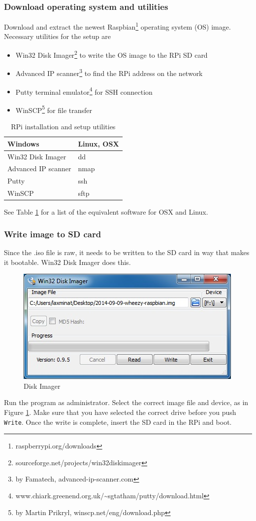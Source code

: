 \subsubsection{Download operating system and utilities}
Download and extract the newest Raspbian\footnote{raspberrypi.org/downloads} operating system (OS) image. Necessary utilities for the setup are
\begin{itemize}
	\item Win32 Disk Imager\footnote{sourceforge.net/projects/win32diskimager} to write the OS image to the RPi SD card
	\item Advanced IP scanner\footnote{by Famatech, advanced-ip-scanner.com} to find the RPi address on the network 
	\item Putty terminal emulator\footnote{www.chiark.greenend.org.uk/\textasciitilde{}sgtatham/putty/download.html} for SSH connection
	\item WinSCP\footnote{by Martin Prikryl, winscp.net/eng/download.php} for file transfer
\end{itemize}
\begin{table}[h!]
	\centering
	\begin{tabular}{ll}
		\hline
		Windows & Linux, OSX\\
		\hline 
		Win32 Disk Imager & dd\\
		Advanced IP scanner & nmap\\
		Putty & ssh\\
		WinSCP & sftp\\
		\hline
	\end{tabular}
	\caption{RPi installation and setup utilities}
	\label{tab:RPi_utilities} 
\end{table}
See Table \ref{tab:RPi_utilities} for a list of the equivalent software for OSX and Linux.
\subsubsection{Write image to SD card}
Since the .iso file is raw, it needs to be written to the SD card in way that makes it bootable. Win32 Disk Imager does this.
\begin{figure}[htb!]
	\centering \includegraphics[scale=0.45]{fig/Rpi_DiskImager} \caption{Disk Imager}
	\label{fig: Disk Imager} 
\end{figure}
Run the program as administrator. Select the correct image file and device, as in Figure \ref{fig: Disk Imager}. Make sure that you have selected the correct drive before you push \texttt{Write}. Once the write is complete, insert the SD card in the RPi and boot.
